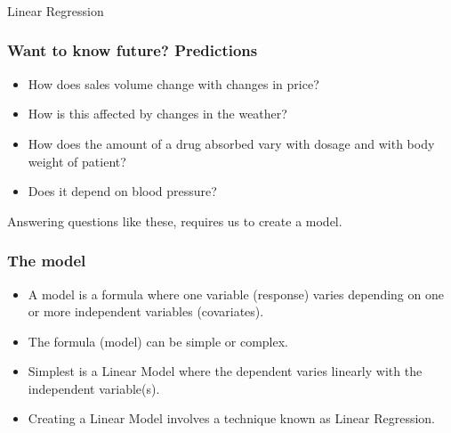 \begin{frame}[fragile]\frametitle{}
\begin{center}
{\Large Linear Regression}
\end{center}
\end{frame}

\begin{frame}[fragile]\frametitle{Want to know future? Predictions}
\begin{itemize}
\item How does sales volume change with changes in price?
\item How is this affected by changes in the weather?
\item How does the amount of a drug absorbed vary with dosage and with body weight of patient? 
\item Does it depend on blood pressure?
\end{itemize}
Answering questions like these, requires us to create a model.
\end{frame}

\begin{frame}[fragile]\frametitle{The model}
\begin{itemize}
\item A model is a formula where one variable (response) varies depending on one or more independent variables (covariates). 
\item The formula (model) can be simple or complex.
\item Simplest is a Linear Model where the dependent varies linearly with the independent variable(s).
\item Creating a Linear Model involves a technique known as Linear Regression.
\end{itemize}
\end{frame}

